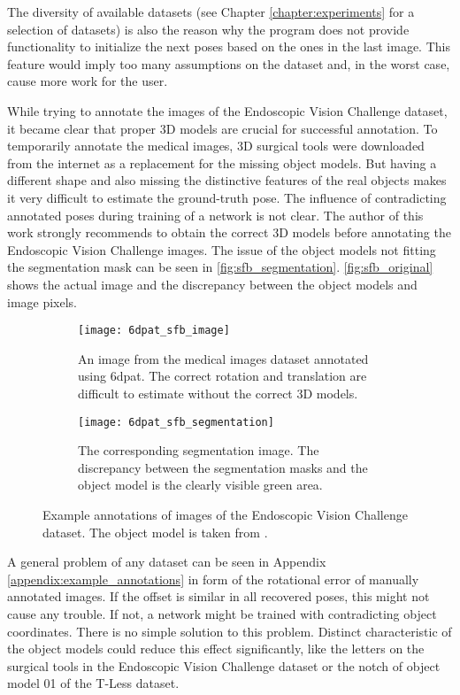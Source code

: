 The diversity of available datasets (see Chapter \ref{chapter:experiments} for a selection of datasets) is also the reason why the program does not provide functionality to initialize the next poses based on the ones in the last image. This feature would imply too many assumptions on the dataset and, in the worst case, cause more work for the user. 

While trying to annotate the images of the Endoscopic Vision Challenge dataset, it became clear that proper 3D models are crucial for successful annotation. To temporarily annotate the medical images, 3D surgical tools were downloaded from the internet as a replacement for the missing object models. But having a different shape and also missing the distinctive features of the real objects makes it very difficult to estimate the ground-truth pose. The influence of contradicting annotated poses during training of a network is not clear. The author of this work strongly recommends to obtain the correct 3D models before annotating the Endoscopic Vision Challenge images. The issue of the object models not fitting the segmentation mask can be seen in \fig \ref{fig:sfb_segmentation}. \fig \ref{fig:sfb_original} shows the actual image and the discrepancy between the object models and image pixels.

\begin{figure}
	\begin{subfigure}[t]{0.47\textwidth}
		\centering
    	\texttt{[image: 6dpat\_sfb\_image]}
    	\caption{An image from the medical images dataset annotated using \ac{6dpat}. The correct rotation and translation are difficult to estimate without the correct 3D models.}
    	\label{fig:6dpat_sfb_image}
	\end{subfigure} 
	\hfill
	\begin{subfigure}[t]{0.47\textwidth}
		\centering
    	\texttt{[image: 6dpat\_sfb\_segmentation]}
    	\caption{The corresponding segmentation image. The discrepancy between the segmentation masks and the object model is the clearly visible green area.}
    	\label{fig:6dpat_sfb_segmentation}
	\end{subfigure} 
	\caption{Example annotations of images of the Endoscopic Vision Challenge dataset. The object model is taken from \cite{3d_scalpel_online}.}
	\label{fig:6dpat_sfb}
\end{figure} 

A general problem of any dataset can be seen in Appendix \ref{appendix:example_annotations} in form of the rotational error of manually annotated images. If the offset is similar in all recovered poses, this might not cause any trouble. If not, a network might be trained with contradicting object coordinates. There is no simple solution to this problem. Distinct characteristic of the object models could reduce this effect significantly, like the letters on the surgical tools in the Endoscopic Vision Challenge dataset or the notch of object model 01 of the T-Less dataset.

